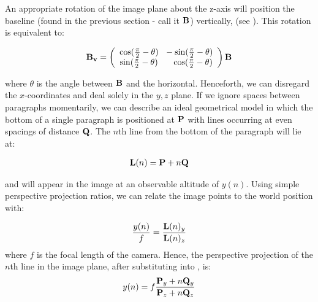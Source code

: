 An appropriate rotation of the image plane about the z-axis will position the
baseline (found in the previous section - call it ${ \bf B }$) vertically, 
(see ). This rotation is equivalent to:

\begin{equation}
{ \bf B_{v} } = \left(\begin{array}{cc}\cos(\frac{\pi}{2}-\theta) ~ ~ -\sin(\frac{\pi}{2}-\theta)\\\sin(\frac{\pi}{2}-\theta) ~  ~  ~ ~ ~ \cos(\frac{\pi}{2}-\theta)\end{array}\right) { \bf B } \label{uprightbaseline}
\end{equation}

{\parindent 0mm
where $\theta$ is the angle between ${ \bf B }$ and the horizontal.
Henceforth, we can disregard the $x$-coordinates and deal
solely in the $y,z$ plane. 
If we ignore spaces between paragraphs momentarily,
we can describe an ideal geometrical model in which
the bottom of a single paragraph is positioned
at ${ \bf P }$ with lines occurring at even spacings of distance ${ \bf Q }$.
The $n$th line from the bottom of the paragraph will lie at:
}


\begin{eqnarray}
{ \bf L }(n) = { \bf P }+n{ \bf Q } \label{nthline}
\end{eqnarray}

and will appear in the image at an observable altitude of $y(n)$.
{\parindent 0mm
Using simple perspective projection ratios, we can relate the image points to the world position with:
}

\begin{eqnarray}
\frac{y(n)}{f}  = \frac{ { \bf L }(n)_y }{ { \bf L }(n)_z }  \label{spacingspq1}
\end{eqnarray}
{\parindent 0mm
where $f$ is the focal length of the camera. Hence, the perspective projection
of the  $n$th line in the image plane, after substituting  into
, is: 
}
\begin{eqnarray}
y(n) =  f \frac{ { \bf P }_y + n { \bf Q }_y }{ { \bf P }_z + n{ \bf Q }_z } \label{spacingspq}
\end{eqnarray}

